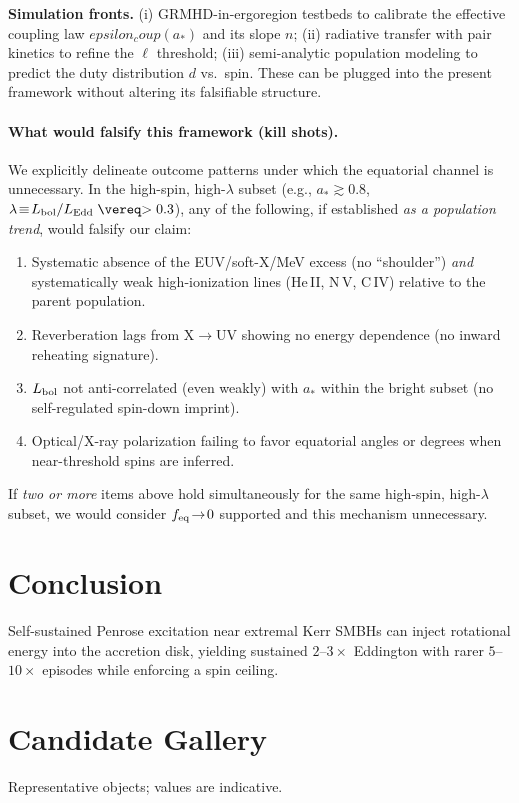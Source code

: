 \documentclass[twocolumn]{aastex701}
\newcommand{\epscoup}{\epsilon_{\rm coup}}
\newcommand{\aeq}{a_{\rm eq}}
\def\epscoup{epsilon_coup}\def\aeq{a_eq}\def\mathrm#1{#1}%
\begin{document}
\noindent\textbf{Simulation fronts.}
(i) GRMHD-in-ergoregion testbeds to calibrate the effective coupling law $\epscoup(a_\ast)$ and its slope $n$; (ii) radiative transfer with pair kinetics to refine the $\ell$ threshold; (iii) semi-analytic population modeling to predict the duty distribution $d$ vs.\ spin. These can be plugged into the present framework without altering its falsifiable structure.

\paragraph{What would falsify this framework (kill shots).}
We explicitly delineate outcome patterns under which the equatorial channel is unnecessary. In the high-spin, high-$\lambda$ subset (e.g., $a_*\gtrsim0.8$, $\lambda\!\equiv\!L_{\rm bol}/L_{\rm Edd}\gtrsim0.3$), any of the following, if established \emph{as a population trend}, would falsify our claim:
\begin{enumerate}
\item Systematic absence of the EUV/soft-X/MeV excess (no ``shoulder'') \emph{and} systematically weak high-ionization lines (He\,II, N\,V, C\,IV) relative to the parent population.
\item Reverberation lags from X$\rightarrow$UV showing no energy dependence (no inward reheating signature).
\item $L_{\rm bol}$ not anti-correlated (even weakly) with $a_*$ within the bright subset (no self-regulated spin-down imprint).
\item Optical/X-ray polarization failing to favor equatorial angles or degrees when near-threshold spins are inferred.
\end{enumerate}
If \emph{two or more} items above hold simultaneously for the same high-spin, high-$\lambda$ subset, we would consider $f_{\rm eq}\!\to\!0$ supported and this mechanism unnecessary.

\section{Conclusion}\label{sec:conclusion}
Self-sustained Penrose excitation near extremal Kerr SMBHs can inject rotational energy into the accretion disk, yielding sustained $2$--$3\times$ Eddington with rarer $5$--$10\times$ episodes while enforcing a spin ceiling.

\clearpage
\FloatBarrier
\appendix

\section{Candidate Gallery}\label{app:candidates}
Representative objects; values are indicative.
\end{document}
